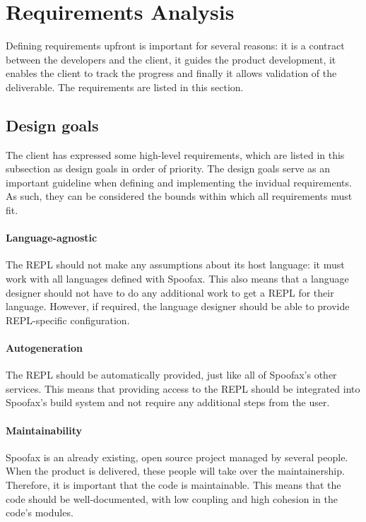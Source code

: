 \section{Requirements Analysis}
\label{sec:requirement-analysis}

Defining requirements upfront is important for several reasons: it is a contract
between the developers and the client, it guides the product development, it
enables the client to track the progress and finally it allows validation of the
deliverable. The requirements are listed in this section.

\subsection{Design goals}
\label{ssec:goals}

The client has expressed some high-level requirements, which are listed in this
subsection as design goals in order of priority. The design goals serve as an
important guideline when defining and implementing the invidual requirements. As
such, they can be considered the bounds within which all requirements must fit.

\paragraph{Language-agnostic} The REPL should not make any assumptions about its
host language: it must work with all languages defined with Spoofax. This also
means that a language designer should not have to do any additional work to get
a REPL for their language. However, if required, the language designer should be
able to provide REPL-specific configuration.

\paragraph{Autogeneration} The REPL should be automatically provided, just like
all of Spoofax's other services. This means that providing access to the REPL
should be integrated into Spoofax's build system and not require any additional
steps from the user.

\paragraph{Maintainability} Spoofax is an already existing, open source project
managed by several people. When the product is delivered, these people will take
over the maintainership. Therefore, it is important that the code is
maintainable. This means that the code should be well-documented, with low
coupling and high cohesion in the code's modules.


